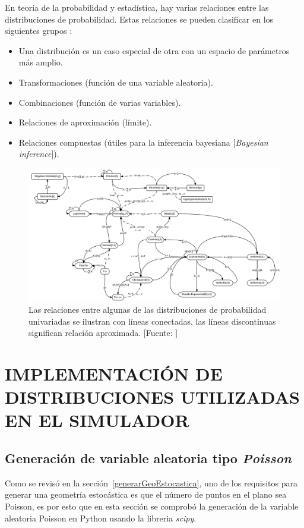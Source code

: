 En teoría de la probabilidad y estadística, hay varias relaciones entre las distribuciones de probabilidad. Estas relaciones se pueden clasificar en los siguientes grupos \parencite{univariateDist}:
\begin{itemize}
    \item Una distribución es un caso especial de otra con un espacio de parámetros más amplio.
    \item Transformaciones (función de una variable aleatoria).
    \item Combinaciones (función de varias variables).
    \item Relaciones de aproximación (límite).
    \item Relaciones compuestas (útiles para la inferencia bayesiana [\textit{Bayesian inference}]).
\end{itemize}

\begin{figure}[th]
    \centering
    \includegraphics[scale=0.63]{Figures/RelacionesProbabilidad}
    \decoRule
    \caption[Relaciones entre algunas de las distribuciones de probabilidad univariadas]{Las relaciones entre algunas de las distribuciones de probabilidad univariadas se ilustran con líneas conectadas, las líneas discontinuas significan relación aproximada. [Fuente: \parencite{univariateDist}]}
    \label{fig:relacionesDistribuciones}
\end{figure}

\break

\section{IMPLEMENTACIÓN DE DISTRIBUCIONES UTILIZADAS EN EL SIMULADOR}

\subsection{Generación de variable aleatoria tipo \textit{Poisson}}
Como se revisó en la sección~\ref{generarGeoEstocastica}, uno de los requisitos para generar una geometría estocástica es que el número de puntos en el plano sea Poisson, es por esto que en esta sección se comprobó la generación de la variable aleatoria Poisson en Python usando la libreria \textit{scipy}.\newline


